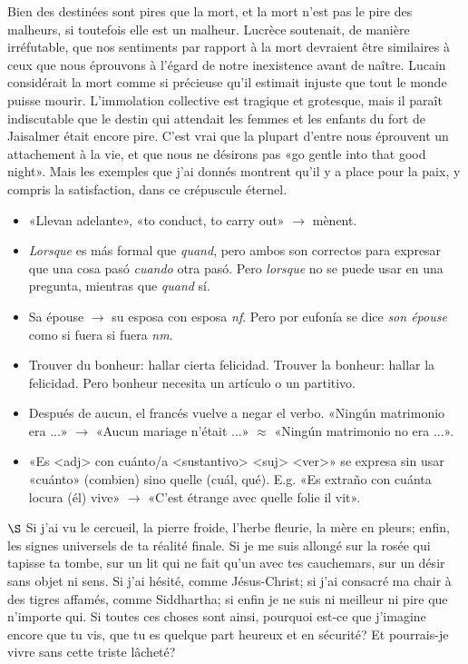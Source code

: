 \documentclass[a4paper, 12pt]{article}
\begin{document}
Bien des destinées sont pires que la mort, et la mort n'est pas le pire des
malheurs, si toutefois elle est un malheur. Lucrèce soutenait, de manière
irréfutable, que nos sentiments par rapport à la mort devraient être similaires
à ceux que nous éprouvons à l'égard de notre inexistence avant de naître. Lucain
considérait la mort comme si précieuse qu'il estimait injuste que tout le monde
puisse mourir. L'immolation collective est tragique et grotesque, mais il paraît
indiscutable que le destin qui attendait les femmes et les enfants du fort de
Jaisalmer était encore pire. C'est vrai que la plupart d'entre nous éprouvent un
attachement à la vie, et que nous ne désirons pas «go gentle into that good
night». Mais les exemples que j'ai donnés montrent qu'il y a place pour la paix,
y compris la satisfaction, dans ce crépuscule éternel.




\begin{itemize}
    \item «Llevan adelante», «to conduct, to carry out» $\to $ mènent.
    \item \textit{Lorsque} es más formal que \textit{quand}, pero ambos son
        correctos para expresar que una cosa pasó \textit{cuando} otra pasó. 
        Pero \textit{lorsque} no se puede usar en una pregunta, mientras que 
        \textit{quand} sí. 
    \item Sa épouse $\to $ su esposa con esposa \textit{nf}. Pero por eufonía se
        dice \textit{son épouse} como si fuera si fuera \textit{nm}.
    \item Trouver du bonheur: hallar cierta felicidad. Trouver la bonheur:
        hallar la felicidad. Pero bonheur necesita un artículo o un partitivo.
    \item Después de aucun, el francés vuelve a negar el verbo. «Ningún
        matrimonio era ...» $\to $ «Aucun mariage n'était ...» $\approx$ «Ningún
        matrimonio no era ...». 
    \item «Es <adj> con cuánto/a <sustantivo> <suj> <ver>» se expresa sin usar
        «cuánto» (combien) sino quelle (cuál, qué). E.g. «Es extraño con
        cuánta locura (él) vive» $\to $ «C'est étrange avec quelle folie il
        vit».
\end{itemize}


\pagebreak 

$\S$ 
Si j'ai vu le cercueil, la pierre froide, l'herbe fleurie, la mère en
pleurs; enfin, les signes universels de ta réalité finale. Si je me suis allongé
sur la rosée qui tapisse ta tombe, sur un lit qui ne fait qu'un avec tes
cauchemars, sur un désir sans objet ni sens. Si j'ai hésité, comme Jésus-Christ;
si j'ai consacré ma chair à des tigres affamés, comme Siddhartha; si enfin je ne
suis ni meilleur ni pire que n'importe qui. Si toutes ces choses sont ainsi,
pourquoi est-ce que j'imagine encore que tu vis, que tu es quelque part heureux
et en sécurité? Et pourrais-je vivre sans cette triste lâcheté?
\end{document}
